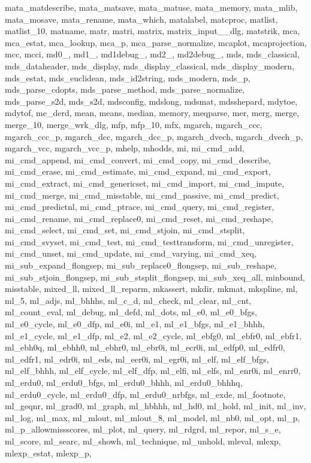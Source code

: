 {{    mata_matdescribe, mata_matsave, mata_matuse, mata_memory, mata_mlib, mata_mosave, mata_rename, mata_which, matalabel, matcproc, matlist, matlist_10, matname, matr, matri, matrix, matrix_input__dlg, matstrik, mca,
    mca_estat, mca_lookup, mca_p, mca_parse_normalize, mcaplot, mcaprojection, mcc, mcci, md0_, md1_, md1debug_, md2_, md2debug_, mds, mds_classical, mds_dataheader, mds_display, mds_display_classical, mds_display_modern,
    mds_estat, mds_euclidean, mds_id2string, mds_modern, mds_p, mds_parse_cdopts, mds_parse_method, mds_parse_normalize, mds_parse_s2d, mds_s2d, mdsconfig, mdslong, mdsmat, mdsshepard, mdytoe, mdytof, me_derd, mean,
    means, median, memory, meqparse, mer, merg, merge, merge_10, merge_wrk_dlg, mfp, mfp_10, mfx, mgarch, mgarch_ccc, mgarch_ccc_p, mgarch_dcc, mgarch_dcc_p, mgarch_dvech, mgarch_dvech_p, mgarch_vcc, mgarch_vcc_p, mhelp,
    mhodds, mi, mi_cmd_add, mi_cmd_append, mi_cmd_convert, mi_cmd_copy, mi_cmd_describe, mi_cmd_erase, mi_cmd_estimate, mi_cmd_expand, mi_cmd_export, mi_cmd_extract, mi_cmd_genericset, mi_cmd_import, mi_cmd_impute,
    mi_cmd_merge, mi_cmd_misstable, mi_cmd_passive, mi_cmd_predict, mi_cmd_predictnl, mi_cmd_ptrace, mi_cmd_query, mi_cmd_register, mi_cmd_rename, mi_cmd_replace0, mi_cmd_reset, mi_cmd_reshape, mi_cmd_select, mi_cmd_set,
    mi_cmd_stjoin, mi_cmd_stsplit, mi_cmd_svyset, mi_cmd_test, mi_cmd_testtransform, mi_cmd_unregister, mi_cmd_unset, mi_cmd_update, mi_cmd_varying, mi_cmd_xeq, mi_sub_expand_flongsep, mi_sub_replace0_flongsep,
    mi_sub_reshape, mi_sub_stjoin_flongsep, mi_sub_stsplit_flongsep, mi_sub_xeq_all, minbound, misstable, mixed_ll, mixed_ll_reparm, mkassert, mkdir, mkmat, mkspline, ml, ml_5, ml_adjs, ml_bhhhs, ml_c_d, ml_check,
    ml_clear, ml_cnt, ml_count_eval, ml_debug, ml_defd, ml_dots, ml_e0, ml_e0_bfgs, ml_e0_cycle, ml_e0_dfp, ml_e0i, ml_e1, ml_e1_bfgs, ml_e1_bhhh, ml_e1_cycle, ml_e1_dfp, ml_e2, ml_e2_cycle, ml_ebfg0, ml_ebfr0, ml_ebfr1,
    ml_ebh0q, ml_ebhh0, ml_ebhr0, ml_ebr0i, ml_ecr0i, ml_edfp0, ml_edfr0, ml_edfr1, ml_edr0i, ml_eds, ml_eer0i, ml_egr0i, ml_elf, ml_elf_bfgs, ml_elf_bhhh, ml_elf_cycle, ml_elf_dfp, ml_elfi, ml_elfs, ml_enr0i, ml_enrr0,
    ml_erdu0, ml_erdu0_bfgs, ml_erdu0_bhhh, ml_erdu0_bhhhq, ml_erdu0_cycle, ml_erdu0_dfp, ml_erdu0_nrbfgs, ml_exde, ml_footnote, ml_geqnr, ml_grad0, ml_graph, ml_hbhhh, ml_hd0, ml_hold, ml_init, ml_inv, ml_log, ml_max,
    ml_mlout, ml_mlout_8, ml_model, ml_nb0, ml_opt, ml_p, ml_p_allowmissscores, ml_plot, ml_query, ml_rdgrd, ml_repor, ml_s_e, ml_score, ml_searc, ml_showh, ml_technique, ml_unhold, mleval, mlexp, mlexp_estat, mlexp_p,
}}
